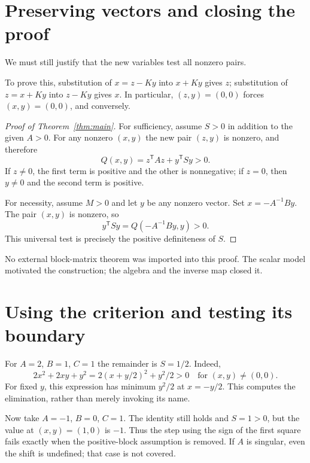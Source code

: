 \documentclass[12pt,reqno]{amsart}
\begin{document}
\section{Preserving vectors and closing the proof}
We must still justify that the new variables test all nonzero pairs.
\begin{lemma}\label{lem:inverse}

\end{lemma}
To prove this, substitution of $x=z-Ky$ into $x+Ky$ gives $z$;
substitution of $z=x+Ky$ into $z-Ky$ gives $x$. In particular,
$(z,y)=(0,0)$ forces $(x,y)=(0,0)$, and conversely.

\begin{proof}[Proof of Theorem~\ref{thm:main}]
For sufficiency, assume $S>0$ in addition to the given $A>0$.
For any nonzero $(x,y)$ the new pair $(z,y)$ is nonzero, and therefore
\[
 Q(x,y)=z^{\mathsf T}Az+y^{\mathsf T}Sy>0.
\]
If $z\ne0$, the first term is positive and the other is nonnegative;
if $z=0$, then $y\ne0$ and the second term is positive.

For necessity, assume $M>0$ and let $y$ be any nonzero vector. Set
$x=-A^{-1}By$. The pair $(x,y)$ is nonzero, so
\[
 y^{\mathsf T}Sy=Q(-A^{-1}By,y)>0.
\]
This universal test is precisely the positive definiteness of $S$.
\end{proof}
No external block-matrix theorem was imported into this proof. The scalar
model motivated the construction; the algebra and the inverse map closed it.

\section{Using the criterion and testing its boundary}
For $A=2$, $B=1$, $C=1$ the remainder is $S=1/2$. Indeed,
\[
 2x^2+2xy+y^2=2(x+y/2)^2+y^2/2>0
 \quad\text{for }(x,y)\ne(0,0).
\]
For fixed $y$, this expression has minimum $y^2/2$ at $x=-y/2$.
This computes the elimination, rather than merely invoking its name.

Now take $A=-1$, $B=0$, $C=1$. The identity still holds and $S=1>0$,
but the value at $(x,y)=(1,0)$ is $-1$. Thus the step using the sign of
the first square fails exactly when the positive-block assumption is removed.
If $A$ is singular, even the shift is undefined; that case is not covered.

\nocite{S-guide}


\end{document}
